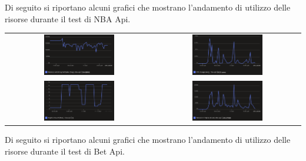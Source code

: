 Di seguito si riportano alcuni grafici che mostrano l'andamento di utilizzo delle risorse durante il test di NBA Api.

\begin{tabular}{ c c }
    \includegraphics[width=0.5\textwidth]{img/load_test/nba-api-mem-avg.png} & \includegraphics[width=0.5\textwidth]{img/load_test/nba-api-cpu-avg.png} \\
    \includegraphics[width=0.5\textwidth]{img/load_test/nba-api-rep-count.png} & \includegraphics[width=0.5\textwidth]{img/load_test/nba-api-rx-sum.png} \\
\end{tabular}

Di seguito si riportano alcuni grafici che mostrano l'andamento di utilizzo delle risorse durante il test di Bet Api.

